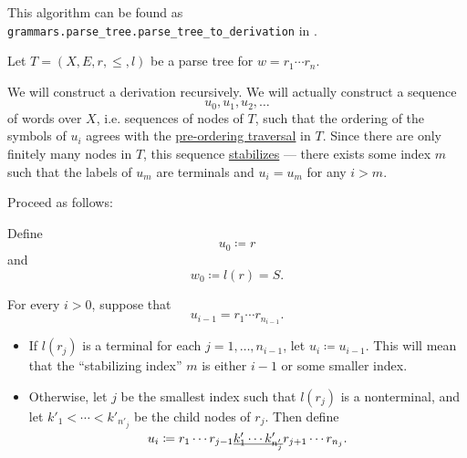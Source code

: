 \begin{comments}
  \item This algorithm can be found as \texttt{grammars.parse\_tree.parse\_tree\_to\_derivation} in \cite{code}.
\end{comments}

\begin{algorithm}\label{alg:parse_tree_to_leftmost_derivation}
  Let \( T = (X, E, r, \leq, l) \) be a parse tree for \( w = r_1 \cdots r_n \).

  We will construct a derivation recursively. We will actually construct a sequence
  \begin{equation*}
    u_0, u_1, u_2, \ldots
  \end{equation*}
  of words over \( X \), i.e. sequences of nodes of \( T \), such that the ordering of the symbols of \( u_i \) agrees with the \hyperref[def:traversal_ordering]{pre-ordering traversal} in \( T \). Since there are only finitely many nodes in \( T \), this sequence \hyperref[def:stabilizing_sequence]{stabilizes} --- there exists some index \( m \) such that the labels of \( u_m \) are terminals and \( u_i = u_m \) for any \( i > m \).

  Proceed as follows:
  \begin{thmenum}
     Define
    \begin{equation*}
      u_0 \coloneqq r
    \end{equation*}
    and
    \begin{equation*}
      w_0 \coloneqq l(r) = S.
    \end{equation*}

     For every \( i > 0 \), suppose that
    \begin{equation*}
      u_{i-1} = r_1 \cdots r_{n_{i-1}}.
    \end{equation*}

    \begin{itemize}
      \item If \( l(r_j) \) is a terminal for each \( j = 1, \ldots, n_{i-1} \), let \( u_i \coloneqq u_{i-1} \). This will mean that the \enquote{stabilizing index} \( m \) is either \( i - 1 \) or some smaller index.

      \item Otherwise, let \( j \) be the smallest index such that \( l(r_j) \) is a nonterminal, and let \( k'_1 < \cdots < k'_{n'_j} \) be the child nodes of \( r_j \). Then define
      \begin{equation*}
        u_i \coloneqq r_1 \cdots r_{j-1} \underline{\smash{ k'_1 \cdots k'_{n'_j} }} r_{j+1} \cdots r_{n_j}.
      \end{equation*}


\end{itemize}
\end{thmenum}
\end{algorithm}

